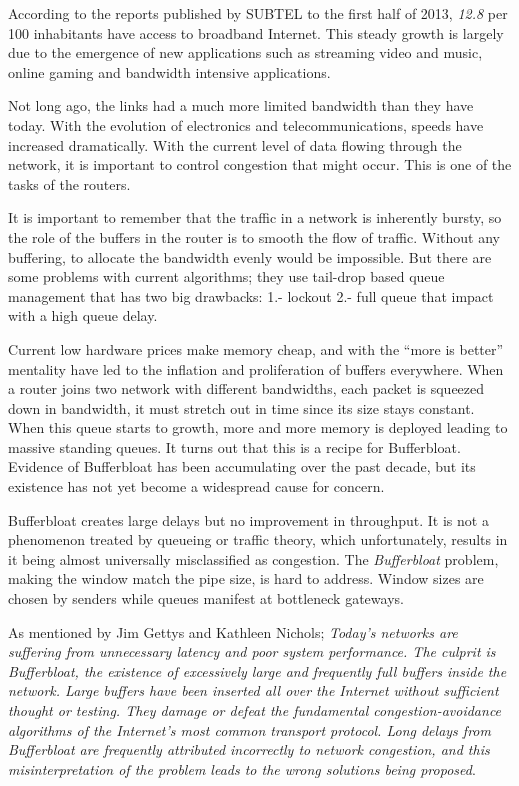 According to the reports published by SUBTEL to the first half of 2013,
\textit{12.8} per 100 inhabitants have access to broadband
Internet\cite{OCDE}.  This steady growth is largely due to the emergence of
new applications such as streaming video and music, online gaming and
bandwidth intensive applications.

Not long ago, the links had a much more limited bandwidth than they have
today. With the evolution of electronics and telecommunications,
speeds have increased dramatically. With the current level of data flowing
through the network, it is important to control congestion that
might occur. This is one of the tasks of the routers.

It is important to remember that the traffic in a network is inherently
bursty, so the role of the buffers in the router is to smooth the flow of
traffic. Without any buffering, to allocate the bandwidth evenly would be
impossible. But there are some problems with current algorithms; they use
tail-drop based queue management that has two big drawbacks: 1.- lockout 2.-
full queue that impact with a high queue delay.

Current low hardware prices make memory cheap,
and with the ``more is better'' mentality have led to the inflation and
proliferation of buffers everywhere\cite{NicholsJacobsonCQD}. When a router
joins two network with different bandwidths, each packet is squeezed down in
bandwidth, it must stretch out in time since its size stays constant. When
this queue starts to growth, more and more memory is deployed leading to
massive standing queues. It turns out that this is a recipe for Bufferbloat.
Evidence of Bufferbloat has been accumulating over the past decade, but its
existence has not yet become a widespread cause for concern.

Bufferbloat creates large delays but no improvement in throughput. It is not a
phenomenon treated by queueing or traffic theory, which unfortunately, results
in it being almost universally misclassified as congestion. The \textit{\gls{Bufferbloat}}
problem, making the window match the pipe size, is hard to address. Window
sizes are chosen by senders while queues manifest at bottleneck gateways.


As mentioned by Jim Gettys and Kathleen Nichols;
\textit{Today's networks are suffering from unnecessary latency and poor
system performance. The culprit is Bufferbloat, the existence of excessively
large and frequently full buffers inside the network. Large buffers have been
inserted all over the Internet without sufficient thought or testing. They
damage or defeat the fundamental congestion-avoidance algorithms of the
Internet's most common transport protocol. Long delays from Bufferbloat are
frequently attributed incorrectly to network congestion, and this
misinterpretation of the problem leads to the wrong solutions being
proposed}\cite{GettysNichols}.

